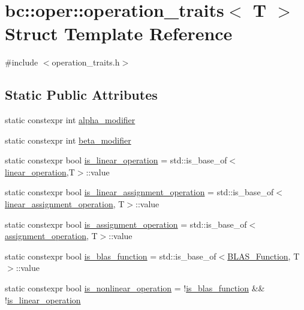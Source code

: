\hypertarget{structbc_1_1oper_1_1operation__traits}{}\section{bc\+:\+:oper\+:\+:operation\+\_\+traits$<$ T $>$ Struct Template Reference}
\label{structbc_1_1oper_1_1operation__traits}


{\ttfamily \#include $<$operation\+\_\+traits.\+h$>$}

\subsection*{Static Public Attributes}
\begin{DoxyCompactItemize}
\item 
static constexpr int \hyperlink{structbc_1_1oper_1_1operation__traits_acb09b3c89cc154e01c8948a1996e1df2}{alpha\+\_\+modifier}
\item 
static constexpr int \hyperlink{structbc_1_1oper_1_1operation__traits_a18401bbd284e30d4af842462e5a0e49a}{beta\+\_\+modifier}
\item 
static constexpr bool \hyperlink{structbc_1_1oper_1_1operation__traits_a5c6b55625ee7aa6ea197fa8e3ad98ba6}{is\+\_\+linear\+\_\+operation} = std\+::is\+\_\+base\+\_\+of$<$\hyperlink{structbc_1_1oper_1_1linear__operation}{linear\+\_\+operation},T$>$\+::value
\item 
static constexpr bool \hyperlink{structbc_1_1oper_1_1operation__traits_a50978967240801dd4b9ca029e9e003f4}{is\+\_\+linear\+\_\+assignment\+\_\+operation} = std\+::is\+\_\+base\+\_\+of$<$\hyperlink{structbc_1_1oper_1_1linear__assignment__operation}{linear\+\_\+assignment\+\_\+operation}, T$>$\+::value
\item 
static constexpr bool \hyperlink{structbc_1_1oper_1_1operation__traits_a25bdb0c5116cbafc2adfffda6ad5e0e8}{is\+\_\+assignment\+\_\+operation} = std\+::is\+\_\+base\+\_\+of$<$\hyperlink{structbc_1_1oper_1_1assignment__operation}{assignment\+\_\+operation}, T$>$\+::value
\item 
static constexpr bool \hyperlink{structbc_1_1oper_1_1operation__traits_a330c3f46193bcb67fb5c65464ea9c0fa}{is\+\_\+blas\+\_\+function} = std\+::is\+\_\+base\+\_\+of$<$\hyperlink{structbc_1_1oper_1_1BLAS__Function}{B\+L\+A\+S\+\_\+\+Function}, T$>$\+::value
\item 
static constexpr bool \hyperlink{structbc_1_1oper_1_1operation__traits_aa90cc400c5e92fb822069d146df37e23}{is\+\_\+nonlinear\+\_\+operation} = !\hyperlink{structbc_1_1oper_1_1operation__traits_a330c3f46193bcb67fb5c65464ea9c0fa}{is\+\_\+blas\+\_\+function} \&\& !\hyperlink{structbc_1_1oper_1_1operation__traits_a5c6b55625ee7aa6ea197fa8e3ad98ba6}{is\+\_\+linear\+\_\+operation}
\end{DoxyCompactItemize}


